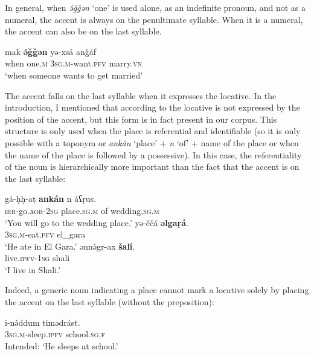 \documentclass[output=paper]{langsci/langscibook}
\begin{document}
In general, when {\emph{ə́ǧǧən}} `one' is used alone, as an indefinite pronoun, and not as a numeral, the accent is always on the penultimate syllable. When it is a numeral, the accent can also be on the last syllable.

\begin{exe}
\ex\label{5ex:36}
\gll	mak	{\textbf{ə́ǧǧən}}	yə-xsá	anǧáf \\
	when	one.{\textsc{m}}	{\textsc{3sg.m}}-want.{\textsc{pfv}}	marry.{\textsc{vn}} \\
\glt	`when someone wants to get married'
\end{exe}


The accent falls on the last syllable when it expresses the locative. In the introduction, I mentioned that according to \cite{louali:03} the locative is not expressed by the position of the accent, but this form is in fact present in our corpus. This structure is only used when the place is referential and identifiable (so it is only possible with a toponym or {\emph{ankán}} `place' + {\emph{n}} `of' + name of the place or when the name of the place is followed by a possessive). In this case, the referentiality of the noun is hierarchically more important than the fact that the accent is on the last syllable:


\begin{exe}
\ex\label{5ex:37}
\gll	gá-ḥḥ-aṭ	{\textbf{ankán}}	n	áʕṛus. \\
	{\textsc{irr}}-go.{\textsc{aor-2sg}}	place.{\textsc{sg.m}}	of	wedding.{\textsc{sg.m}} \\
\glt	`You will go to the wedding place.' 
\ex\label{5ex:38}
\gll	yə-ččá	{\textbf{əlgaṛá}}. \\
	{\textsc{3sg.m}}-eat.{\textsc{pfv}}	el\_gara \\
\glt	`He ate in El Gara.'
\ex\label{5ex:39}
\gll	ənnə́gr-ax		{\textbf{šalí}}. \\
	live.{\textsc{ipfv-1sg}}	shali \\
\glt	`I live in Shali.'
\end{exe}

Indeed, a generic noun indicating a place cannot mark a locative solely by placing the accent on the last syllable (without the preposition):

\begin{exe}
\ex\label{5ex:40}
\gll	*i-nə́ddum		timədrást. \\
	{\textsc{3sg.m}}-sleep.{\textsc{ipfv}}	school.{\textsc{sg.f}} \\
\glt	Intended: `He sleeps at school.'
\end{exe}
\end{document}
